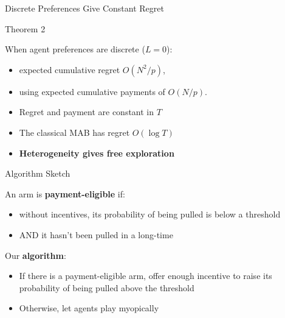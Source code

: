 \documentclass[serif]{beamer}
\begin{document}


\begin{frame}{\large{Discrete Preferences Give Constant Regret}}
\begin{alertblock}{Theorem 2}

When agent preferences are discrete ($L=0$):
\begin{itemize}
\item expected cumulative regret $O (N^2/p)$,
\item using expected cumulative payments of $O(N/p)$.
\end{itemize}
\end{alertblock}

\begin{itemize}
\item Regret and payment are constant in $T$
\item The classical MAB has regret $O(\log T)$
\item \textbf{Heterogeneity gives free exploration}
\end{itemize}

\end{frame}



\begin{frame}{Algorithm Sketch}

An arm is \textbf{payment-eligible} if:
\begin{itemize}
\item without incentives, its probability of being pulled is below a threshold
\item AND it hasn't been pulled in a long-time
\end{itemize}
\vspace{0.5cm}

Our \textbf{algorithm}:
\begin{itemize}
\item If there is a payment-eligible arm, offer enough incentive to raise its probability of being pulled above the threshold
\item Otherwise, let agents play myopically
\end{itemize}
\end{frame}
\end{document}
